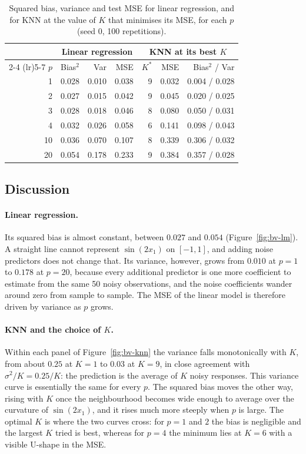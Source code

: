 \begin{table}[H]
  \centering
  \begin{tabular}{rrrrrrr}
    \toprule
    & \multicolumn{3}{c}{Linear regression} & \multicolumn{3}{c}{KNN at its best $K$} \\
    \cmidrule(lr){2-4} \cmidrule(lr){5-7}
    $p$ & Bias$^2$ & Var & MSE & $K^*$ & MSE & Bias$^2$ / Var \\
    \midrule
    1  & 0.028 & 0.010 & 0.038 & 9 & 0.032 & 0.004 / 0.028 \\
    2  & 0.027 & 0.015 & 0.042 & 9 & 0.045 & 0.020 / 0.025 \\
    3  & 0.028 & 0.018 & 0.046 & 8 & 0.080 & 0.050 / 0.031 \\
    4  & 0.032 & 0.026 & 0.058 & 6 & 0.141 & 0.098 / 0.043 \\
    10 & 0.036 & 0.070 & 0.107 & 8 & 0.339 & 0.306 / 0.032 \\
    20 & 0.054 & 0.178 & 0.233 & 9 & 0.384 & 0.357 / 0.028 \\
    \bottomrule
  \end{tabular}
  \caption{Squared bias, variance and test MSE for linear regression, and for KNN at the value of $K$ that minimises its MSE, for each $p$ (seed 0, 100 repetitions).}
  \label{tab:bv}
\end{table}

\subsection*{Discussion}

\paragraph{Linear regression.}
Its squared bias is almost constant, between $0.027$ and $0.054$ (Figure~\ref{fig:bv-lm}). A straight line cannot represent $\sin(2x_1)$ on $[-1, 1]$, and adding noise predictors does not change that. Its variance, however, grows from $0.010$ at $p = 1$ to $0.178$ at $p = 20$, because every additional predictor is one more coefficient to estimate from the same 50 noisy observations, and the noise coefficients wander around zero from sample to sample. The MSE of the linear model is therefore driven by variance as $p$ grows.

\paragraph{KNN and the choice of $K$.}
Within each panel of Figure~\ref{fig:bv-knn} the variance falls monotonically with $K$, from about $0.25$ at $K = 1$ to $0.03$ at $K = 9$, in close agreement with $\sigma^2/K = 0.25/K$: the prediction is the average of $K$ noisy responses. This variance curve is essentially the same for every $p$. The squared bias moves the other way, rising with $K$ once the neighbourhood becomes wide enough to average over the curvature of $\sin(2x_1)$, and it rises much more steeply when $p$ is large. The optimal $K$ is where the two curves cross: for $p = 1$ and $2$ the bias is negligible and the largest $K$ tried is best, whereas for $p = 4$ the minimum lies at $K = 6$ with a visible U-shape in the MSE.

